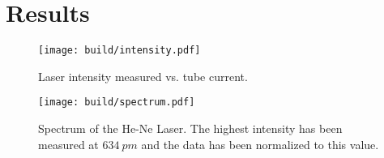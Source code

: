 \section{Results}
\label{sec:results}

\begin{figure*}
  \centering
  \texttt{[image: build/intensity.pdf]}
  \caption{Laser intensity measured vs. tube current.}
  \label{fig:intensity}
\end{figure*}

\begin{figure*}
  \centering
  \texttt{[image: build/spectrum.pdf]}
  \caption{Spectrum of the He-Ne Laser. The highest intensity has been measured at $\SI{634}{pm}$
  and the data has been normalized to this value.}
  \label{fig:intensity}
\end{figure*}
